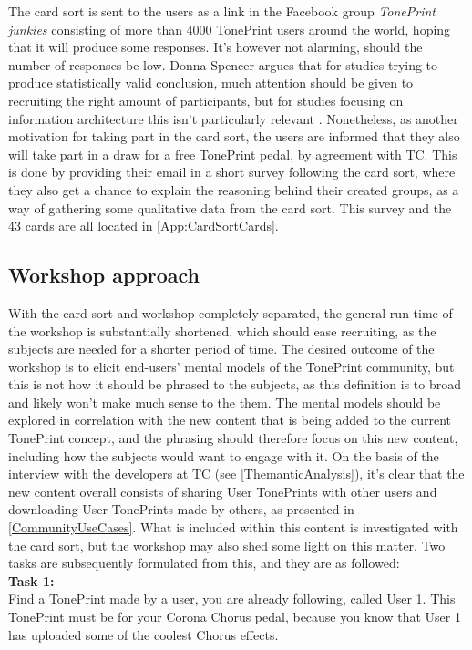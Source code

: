 The card sort is sent to the users as a link in the Facebook group \textit{TonePrint junkies} consisting of more than 4000 TonePrint users around the world, hoping that it will produce some responses. It's however not alarming, should the number of responses be low. Donna Spencer argues that for studies trying to produce statistically valid conclusion, much attention should be given to recruiting the right amount of participants, but for studies focusing on information architecture this isn't particularly relevant \parencite[][130]{WEB:DonnaSpencer}. Nonetheless, as another motivation for taking part in the card sort, the users are informed that they also will take part in a draw for a free TonePrint pedal, by agreement with TC. This is done by providing their email in a short survey following the card sort, where they also get a chance to explain the reasoning behind their created groups, as a way of gathering some qualitative data from the card sort. This survey and the 43 cards are all located in \autoref{App:CardSortCards}.

\subsection{Workshop approach}
\label{WorkshopApproach}
With the card sort and workshop completely separated, the general run-time of the workshop is substantially shortened, which should ease recruiting, as the subjects are needed for a shorter period of time. The desired outcome of the workshop is to elicit end-users' mental models of the TonePrint community, but this is not how it should be phrased to the subjects, as this definition is to broad and likely won't make much sense to the them. The mental models should be explored in correlation with the new content that is being added to the current TonePrint concept, and the phrasing should therefore focus on this new content, including how the subjects would want to engage with it. On the basis of the interview with the developers at TC (see \autoref{ThemanticAnalysis}), it's clear that the new content overall consists of sharing User TonePrints with other users and downloading User TonePrints made by others, as presented in \autoref{CommunityUseCases}. What is included within this content is investigated with the card sort, but the workshop may also shed some light on this matter. Two tasks are subsequently formulated from this, and they are as followed: \\

\noindent
\textbf{Task 1:}\\
\noindent
Find a TonePrint made by a user, you are already following, called User 1. This TonePrint must be for your Corona Chorus pedal, because you know that User 1 has uploaded some of the coolest Chorus effects. \\

